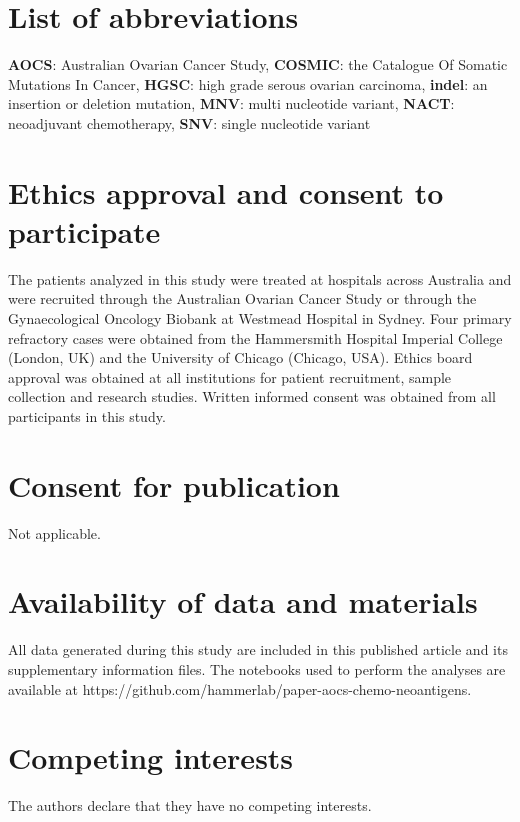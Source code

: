 \documentclass[linenumbers]{bmcart}
\begin{document}

\begin{backmatter}

\section*{List of abbreviations}
\textbf{AOCS}: Australian Ovarian Cancer Study, \textbf{COSMIC}: the Catalogue Of Somatic Mutations In Cancer, \textbf{HGSC}: high grade serous ovarian carcinoma, \textbf{indel}: an insertion or deletion mutation, \textbf{MNV}: multi nucleotide variant, \textbf{NACT}: neoadjuvant chemotherapy, \textbf{SNV}: single nucleotide variant

\section*{Ethics approval and consent to participate}
The patients analyzed in this study were treated at hospitals across Australia and were recruited through the Australian Ovarian Cancer Study or through the Gynaecological Oncology Biobank at Westmead Hospital in Sydney. Four primary refractory cases were obtained from the Hammersmith Hospital Imperial College (London, UK) and the University of Chicago (Chicago, USA). Ethics board approval was obtained at all institutions for patient recruitment, sample collection and research studies. Written informed consent was obtained from all participants in this study.


\section*{Consent for publication}
Not applicable.

\section*{Availability of data and materials}
All data generated during this study are included in this published article and its supplementary information files. The notebooks used to perform the analyses are available at https://github.com/hammerlab/paper-aocs-chemo-neoantigens.

\section*{Competing interests}
  The authors declare that they have no competing interests.
  

\end{backmatter}
\end{document}
